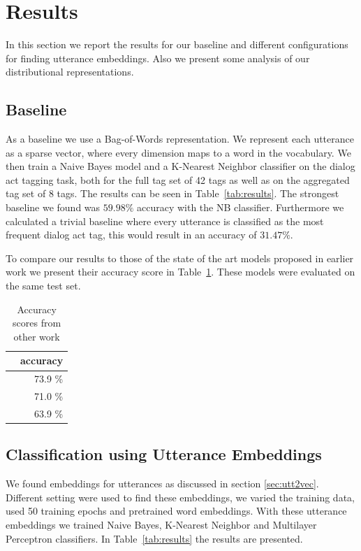 \section{Results}\label{sec:results}
In this section we report the results for our baseline and different configurations for finding utterance embeddings.
Also we present some analysis of our distributional representations.

\subsection{Baseline}
As a baseline we use a Bag-of-Words representation.
We represent each utterance as a sparse vector, where every dimension maps to a word in the vocabulary.
We then train a Naive Bayes model and a K-Nearest Neighbor classifier on the dialog act tagging task, both for the full tag set of 42 tags as well as on the aggregated tag set of 8 tags.
The results can be seen in Table~\ref{tab:results}. The strongest baseline we found was $59.98\%$ accuracy with the NB classifier.
Furthermore we calculated a trivial baseline where every utterance is classified as the most frequent dialog act tag, this would result in an accuracy of $31.47\%$.

To compare our results to those of the state of the art models proposed in earlier work we present their accuracy score in Table~\ref{tab:sota}. These models were evaluated on the same test set.
\begin{table}[t]
	\centering
	\begin{tabular}{r|r}
		& \textbf{accuracy} \\ \hline
		\newcite{kalchbrenner} & 73.9 \%           \\
		\newcite{stolcke2000}  & 71.0 \%           \\
		\newcite{milajevs}     & 63.9 \%          
	\end{tabular}
		\caption{Accuracy scores from other work}
		\label{tab:sota}
\end{table}

\subsection{Classification using Utterance Embeddings}
We found embeddings for utterances as discussed in section \ref{sec:utt2vec}.
Different setting were used to find these embeddings, we varied the training data, used 50 training epochs and pretrained word embeddings.
With these utterance embeddings we trained Naive Bayes, K-Nearest Neighbor and Multilayer Perceptron classifiers.
In Table~\ref{tab:results} the results are presented.

